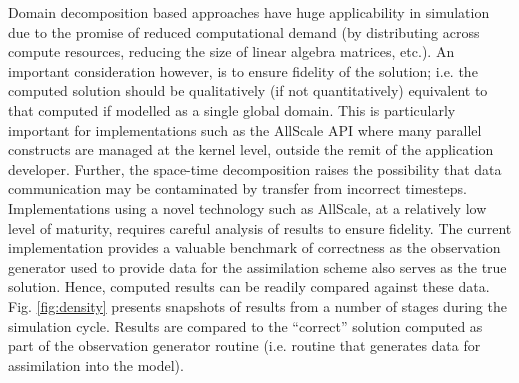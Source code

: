 \documentclass[acmsmall,review,anonymous]{acmart}\settopmatter{printfolios=true,printccs=false,printacmref=false}
\begin{document}
Domain decomposition based approaches have huge applicability in simulation due to the promise of reduced computational demand (by distributing across compute resources, reducing the size of linear algebra matrices, etc.). An important consideration however, is to ensure fidelity of the solution; i.e. the computed solution should be qualitatively (if not quantitatively) equivalent to that computed if modelled as a single global domain. This is particularly important for implementations such as the AllScale API where many parallel constructs are managed at the kernel level, outside the remit of the application developer. Further, the space-time decomposition raises the possibility that data communication may be contaminated by transfer from incorrect timesteps. Implementations using a novel technology such as AllScale, at a relatively low level of maturity, requires careful analysis of results to ensure fidelity. The current implementation provides a valuable benchmark of correctness as the observation generator used to provide data for the assimilation scheme also serves as the true solution. Hence, computed results can be readily compared against these data. Fig. \ref{fig:density} presents snapshots of results from a number of stages during the simulation cycle. Results are compared to the ``correct'' solution computed as part of the observation generator routine (i.e. routine that generates data for assimilation into the model).
\end{document}
